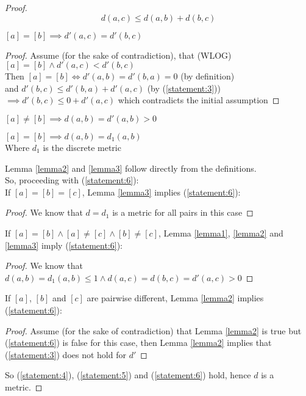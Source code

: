 \begin{proof}
		\begin{equation} \label{statement:6}
			d(a, c) \leq d(a, b) + d(b, c)
		\end{equation}
		\begin{lemma}
		\label{lemma1}
			$[a]=[b] \implies d'(a,c) = d'(b, c)$
		\end{lemma}
		\begin{proof} Assume (for the sake of contradiction), that (WLOG) \\
			$[a]=[b] \land  d'(a , c)< d'(b , c)$ \\
			Then $[a]=[b] \iff d'(a, b)=d'(b, a)=0$ (by definition) \\
			and $d'(b, c) \leq d'(b, a) + d'(a, c)$ (by (\ref{statement:3})) \\
			$ \implies d'(b, c) \leq 0 + d'(a, c) $ which contradicts the initial assumption
		\end{proof}
		\begin{lemma}
		\label{lemma2}
			$[a] \neq [b] \implies d(a, b) = d'(a, b) > 0$
		\end{lemma}
		\begin{lemma}
		\label{lemma3}
			$[a]=[b] \implies d(a, b)=d_1(a , b)$ \\
			Where $d_1$ is the discrete metric
		\end{lemma}
		Lemma \ref{lemma2} and \ref{lemma3} follow directly from the definitions.\\
		So, proceeding with (\ref{statement:6}):\\
		
		If $[a]=[b]=[c]$, Lemma \ref{lemma3} implies (\ref{statement:6}):
		\begin{proof}
			We know that $d=d_1$ is a metric for all pairs in this case
		\end{proof}
		
		If $[a]=[b]\land[a]\neq[c ]\land[b]\neq[c ]$, Lemma \ref{lemma1}, \ref{lemma2} and \ref{lemma3} imply (\ref{statement:6}):
		\begin{proof}
			We know that $d (a , b) = d_1(a,b) \leq 1 \land d (a , c)=d (b , c)=d ' (a , c)>0$
		\end{proof}
		
		If $[a]$, $[b]$ and $[c]$ are pairwise different, Lemma \ref{lemma2} implies (\ref{statement:6}):
		\begin{proof}
			Assume (for the sake of contradiction) that Lemma \ref{lemma2} is true but (\ref{statement:6}) is false for this case, then Lemma \ref{lemma2} implies that (\ref{statement:3}) does not hold for $d'$
		\end{proof}
		
		So (\ref{statement:4}), (\ref{statement:5}) and (\ref{statement:6}) hold, hence $d$ is a metric.
	\end{proof}

